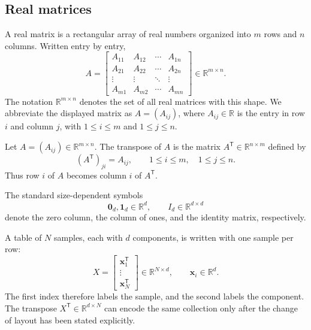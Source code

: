 \subsection{Real matrices}

A real matrix is a rectangular array of real numbers organized into \(m\)
rows and \(n\) columns. Written entry by entry,
\begin{equation}
  A
  =\begin{bmatrix}
      A_{11} & A_{12} & \cdots & A_{1n}\\
      A_{21} & A_{22} & \cdots & A_{2n}\\
      \vdots & \vdots & \ddots & \vdots\\
      A_{m1} & A_{m2} & \cdots & A_{mn}
    \end{bmatrix}
  \in\mathbb R^{m\times n}.
  \label{eq:training-basic-matrix-notation}
\end{equation}
The notation \(\mathbb R^{m\times n}\) denotes the set of all real matrices
with this shape. We abbreviate the displayed matrix as \(A=(A_{ij})\), where
\(A_{ij}\in\mathbb R\) is the entry in row \(i\) and column \(j\), with
\(1\leq i\leq m\) and \(1\leq j\leq n\).

\begin{definition}
\label{def:training-matrix-transpose}
Let \(A=(A_{ij})\in\mathbb R^{m\times n}\). The transpose of \(A\) is the
matrix \(A^{\mathsf T}\in\mathbb R^{n\times m}\) defined by
\begin{equation}
  \left(A^{\mathsf T}\right)_{ji}=A_{ij},
  \qquad
  1\leq i\leq m,
  \quad
  1\leq j\leq n.
  \label{eq:training-matrix-transpose-definition}
\end{equation}
Thus row \(i\) of \(A\) becomes column \(i\) of \(A^{\mathsf T}\).
\end{definition}

The standard size-dependent symbols
\begin{equation}
  \mathbf 0_d,\mathbf 1_d\in\mathbb R^d,
  \qquad
  I_d\in\mathbb R^{d\times d}
\end{equation}
denote the zero column, the column of ones, and the identity matrix,
respectively.

A table of \(N\) samples, each with \(d\) components, is written with one
sample per row:
\begin{equation}
  X
  =\begin{bmatrix}
      \mathbf x_1^{\mathsf T}\\
      \vdots\\
      \mathbf x_N^{\mathsf T}
    \end{bmatrix}
  \in\mathbb R^{N\times d},
  \qquad
  \mathbf x_i\in\mathbb R^d.
  \label{eq:training-point-table-notation}
\end{equation}
The first index therefore labels the sample, and the second labels the
component. The transpose \(X^{\mathsf T}\in\mathbb R^{d\times N}\) can encode
the same collection only after the change of layout has been stated explicitly.

